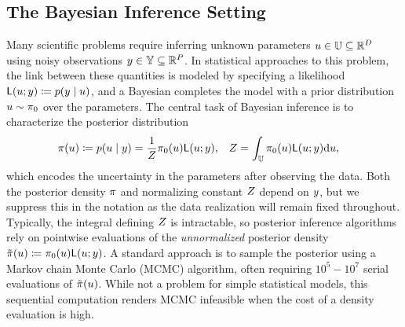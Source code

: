 \documentclass[12pt]{article}
\begin{document}
\subsection{The Bayesian Inference Setting}
Many scientific problems require inferring unknown parameters $u \in \mathbb{U} \subseteq \mathbb{R}^{D}$ using 
noisy observations $y \in \mathbb{Y} \subseteq \mathbb{R}^{P}$. In statistical approaches to this problem, the link
between these quantities is modeled by specifying a likelihood $\mathsf{L}(u; y) \coloneqq p(y \mid u)$, and a Bayesian 
completes the model with a prior distribution $u \sim \pi_0$ over the parameters. 
The central task of Bayesian inference is to characterize the posterior distribution
\begin{align}
&\postDensNorm(\Par) \Def p(\Par \given \obs) = \frac{1}{\normCst} \priorDens(\Par) \lik(\Par; \obs),
&&\normCst = \int_{\parSpace} \priorDens(\Par) \lik(\Par; \obs) \d\Par,
\end{align}
which encodes the uncertainty in the parameters after observing the data. Both the posterior density $\pi$
and normalizing constant $Z$ depend on $y$, but we suppress this in the notation as the data realization 
will remain fixed throughout. Typically, the integral defining $Z$ is intractable, so posterior inference algorithms
rely on pointwise evaluations of the \textit{unnormalized} posterior density $\tilde{\pi}(u) \coloneqq \pi_0(u)\mathsf{L}(u; y)$.
A standard approach is to sample the posterior using a Markov chain Monte Carlo (MCMC) 
algorithm, often requiring $10^5 - 10^7$ serial evaluations of $\tilde{\pi}(u)$. While not a problem for simple 
statistical models, this sequential computation renders MCMC infeasible when the cost of a density evaluation is high.
\end{document}
